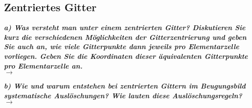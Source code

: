 \subsection{\label{subsec:FZV6}Zentriertes Gitter}
\textbf{\textit{a) Was versteht man unter einem zentrierten Gitter? 
Diskutieren Sie kurz die verschiedenen Möglichkeiten der Gitterzentrierung 
und geben Sie auch an, wie viele Gitterpunkte dann jeweils pro Elementarzelle 
vorliegen. Geben Sie die Koordinaten dieser äquivalenten Gitterpunkte 
pro Elementarzelle an.}}\\
$\rightarrow$

\textbf{\textit{b) Wie und warum entstehen bei zentrierten Gittern im Beugungsbild 
systematische Auslöschungen? Wie lauten diese Auslöschungsregeln?}}\\
$\rightarrow$